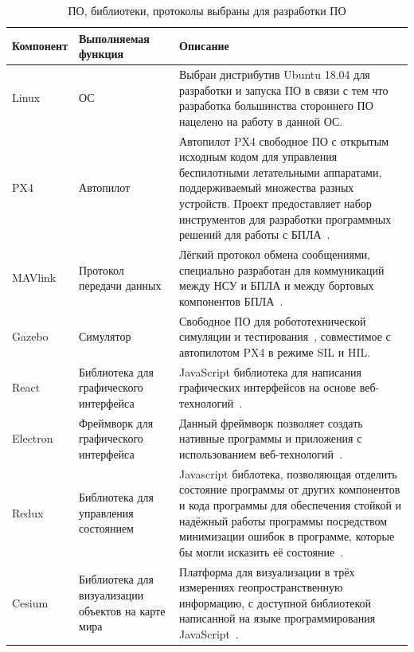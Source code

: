 \documentclass[specification,annotation]{itmo-student-thesis}
\begin{document}
\begin{table}[!h]
  \centering
  \caption{ПО, библиотеки, протоколы выбраны для разработки
  ПО}\label{tab:devbibs}
  \begin{tabularx}{\textwidth}{L{0.5} L{0.6} L{1.9}}
    \hline
    Компонент & Выполняемая функция & Описание \\
    \hline
    Linux & ОС & Выбран дистрибутив Ubuntu 18.04 для разработки и запуска ПО в
    связи с тем что разработка большинства стороннего ПО нацелено на работу в
    данной ОС. \\
    PX4 & Автопилот & Автопилот PX4 свободное ПО с открытым исходным кодом для
    управления беспилотными летательными аппаратами, поддерживаемый множества
    разных устройств. Проект предоставляет набор инструментов для разработки
    программных решений для работы с БПЛА~\cite{px4-guide}. \\
    MAVlink & Протокол передачи данных & Лёгкий протокол обмена сообщениями,
    специально разработан для коммуникаций между НСУ и БПЛА и между бортовых
    компонентов БПЛА~\cite{mavlink-guide}. \\
    Gazebo & Симулятор & Свободное ПО для робототехнической симуляции и
    тестирования~\cite{gazebo-guide}, совместимое с автопилотом PX4 в режиме SIL
    и HIL. \\
    React & Библиотека для графического интерфейса & JavaScript библиотека для
    написания графических интерфейсов на основе
    веб-технологий~\cite{react-documentation}. \\
    Electron & Фреймворк для графического интерфейса & Данный фреймворк
    позволяет создать нативные программы и приложения с использованием
    веб-технологий~\cite{electron-documentation}. \\
    Redux & Библиотека для управления состоянием & Javascript библотека,
    позволяющая отделить состояние программы от других компонентов и кода
    программы для обеспечения стойкой и надёжный работы программы посредством
    минимизации ошибок в программе, которые бы могли исказить её
    состояние~\cite{redux-guide}. \\
    Cesium & Библиотека для визуализации объектов на карте мира & Платформа для
    визуализации в трёх измерениях геопространственную информацию, с доступной
    библиотекой написанной на языке программирования
    JavaScript~\cite{cesium-documentation}. \\
    \hline
  \end{tabularx}
\end{table}
\end{document}
